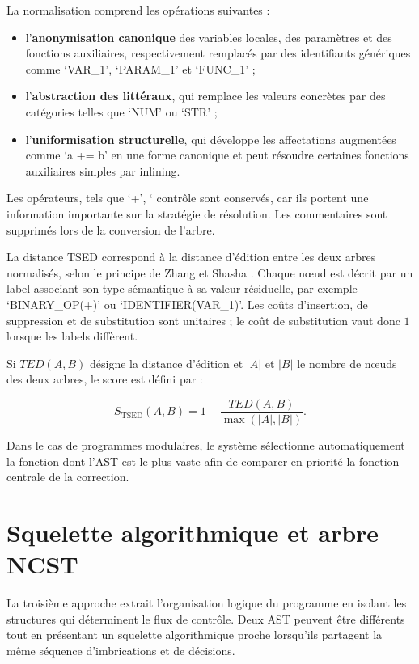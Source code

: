 La normalisation comprend les opérations suivantes :

\begin{itemize}
    \item l'\textbf{anonymisation canonique} des variables locales, des
    paramètres et des fonctions auxiliaires, respectivement remplacés par des
    identifiants génériques comme `VAR\_1', `PARAM\_1' et `FUNC\_1' ;
    \item l'\textbf{abstraction des littéraux}, qui remplace les valeurs
    concrètes par des catégories telles que `NUM' ou `STR' ;
    \item l'\textbf{uniformisation structurelle}, qui développe les
    affectations augmentées comme `a += b' en une forme canonique et peut
    résoudre certaines fonctions auxiliaires simples par inlining.
\end{itemize}

Les opérateurs, tels que `+', `%
contrôle sont conservés, car ils portent une information importante sur la
stratégie de résolution. Les commentaires sont supprimés lors de la
conversion de l'arbre.

La distance TSED correspond à la distance d'édition entre les deux arbres
normalisés, selon le principe de Zhang et Shasha
\cite{zhang_simple_1989,song_revisiting_2024}. Chaque nœud est décrit par un label associant son type sémantique
à sa valeur résiduelle, par exemple `BINARY\_OP(+)' ou
`IDENTIFIER(VAR\_1)'. Les coûts d'insertion, de suppression et de
substitution sont unitaires ; le coût de substitution vaut donc $1$ lorsque
les labels diffèrent.

Si $TED(A,B)$ désigne la distance d'édition et $|A|$ et $|B|$ le nombre de
nœuds des deux arbres, le score est défini par :

\begin{equation}
S_{\mathrm{TSED}}(A,B) =
1 - \frac{TED(A,B)}{\max\left(|A|,|B|\right)}.
\end{equation}

Dans le cas de programmes modulaires, le système sélectionne automatiquement
la fonction dont l'AST est le plus vaste afin de comparer en priorité la
fonction centrale de la correction.

\section{Squelette algorithmique et arbre NCST}

La troisième approche extrait l'organisation logique du programme en isolant
les structures qui déterminent le flux de contrôle. Deux AST peuvent être
différents tout en présentant un squelette algorithmique proche lorsqu'ils
partagent la même séquence d'imbrications et de décisions.

